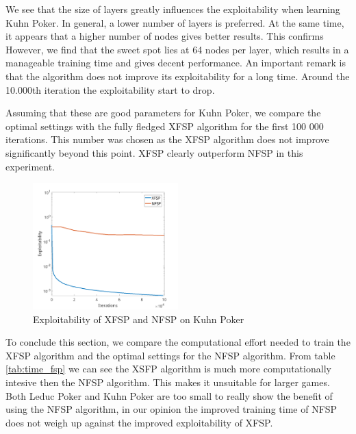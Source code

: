 \documentclass[10pt,a4paper]{article}
\begin{document}
We see that the size of layers greatly influences the exploitability when learning Kuhn Poker. In general, a lower number of layers is preferred. At the same time, it appears that a higher number of nodes gives better results. This confirms However, we find that the sweet spot lies at 64 nodes per layer, which results in a manageable training time and gives decent performance.
An important remark is that the algorithm does not improve its exploitability for a long time. Around the 10.000th iteration the exploitability start to drop. 

Assuming that these are good parameters for Kuhn Poker, we compare the optimal settings with the fully fledged XFSP algorithm for the first 100 000 iterations. This number was chosen as the XFSP algorithm does not improve significantly beyond this point. XFSP clearly outperform NFSP in this experiment.

\begin{figure}[h]
\centering
\label{fig:layers_kuhn}
\includegraphics[width=0.5\textwidth]{Figures/xfsp_nfsp_kuhn.png}
\caption{Exploitability of XFSP and NFSP on Kuhn Poker}
\end{figure}



To conclude this section, we compare the computational effort needed to train the XFSP algorithm and the optimal settings for the NFSP algorithm. From table \ref{tab:time_fsp} we can see the XSFP algorithm is much more computationally intesive then the NFSP algorithm. This makes it unsuitable for larger games. Both Leduc Poker and Kuhn Poker are too small to really show the benefit of using the NFSP algorithm, in our opinion the improved training time of NFSP does not weigh up against the improved exploitability of XFSP.
\end{document}

